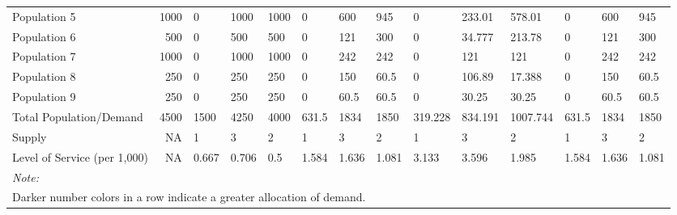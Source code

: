 \documentclass[10pt,letterpaper]{article}
\begin{document}
\begin{landscape}
\begin{table}[t]
\begin{tabular}{lrllllllllllll}
Population 5 & 1000 & \textcolor[HTML]{FCCE25}{0} & \textcolor[HTML]{0D0887}{1000} & \textcolor[HTML]{0D0887}{1000} & \textcolor[HTML]{FCCE25}{0} & \textcolor[HTML]{A51F99}{600} & \textcolor[HTML]{2B0594}{945} & \textcolor[HTML]{FCCE25}{0} & \textcolor[HTML]{F0804E}{233.01} & \textcolor[HTML]{AB2494}{578.01} & \textcolor[HTML]{FCCE25}{0} & \textcolor[HTML]{A51F99}{600} & \textcolor[HTML]{2B0594}{945}\\
\addlinespace
Population 6 & 500 & \textcolor[HTML]{FCCE25}{0} & \textcolor[HTML]{0D0887}{500} & \textcolor[HTML]{0D0887}{500} & \textcolor[HTML]{FCCE25}{0} & \textcolor[HTML]{EF7D50}{121} & \textcolor[HTML]{A51F99}{300} & \textcolor[HTML]{FCCE25}{0} & \textcolor[HTML]{FDB42F}{34.777} & \textcolor[HTML]{CE4B75}{213.78} & \textcolor[HTML]{FCCE25}{0} & \textcolor[HTML]{EF7D50}{121} & \textcolor[HTML]{A51F99}{300}\\
Population 7 & 1000 & \textcolor[HTML]{FCCE25}{0} & \textcolor[HTML]{0D0887}{1000} & \textcolor[HTML]{0D0887}{1000} & \textcolor[HTML]{FCCE25}{0} & \textcolor[HTML]{EF7D50}{242} & \textcolor[HTML]{EF7D50}{242} & \textcolor[HTML]{FCCE25}{0} & \textcolor[HTML]{FCA238}{121} & \textcolor[HTML]{FCA238}{121} & \textcolor[HTML]{FCCE25}{0} & \textcolor[HTML]{EF7D50}{242} & \textcolor[HTML]{EF7D50}{242}\\
Population 8 & 250 & \textcolor[HTML]{FCCE25}{0} & \textcolor[HTML]{0D0887}{250} & \textcolor[HTML]{0D0887}{250} & \textcolor[HTML]{FCCE25}{0} & \textcolor[HTML]{A51F99}{150} & \textcolor[HTML]{EF7D50}{60.5} & \textcolor[HTML]{FCCE25}{0} & \textcolor[HTML]{CE4B75}{106.89} & \textcolor[HTML]{FDB42F}{17.388} & \textcolor[HTML]{FCCE25}{0} & \textcolor[HTML]{A51F99}{150} & \textcolor[HTML]{EF7D50}{60.5}\\
Population 9 & 250 & \textcolor[HTML]{FCCE25}{0} & \textcolor[HTML]{0D0887}{250} & \textcolor[HTML]{0D0887}{250} & \textcolor[HTML]{FCCE25}{0} & \textcolor[HTML]{EF7D50}{60.5} & \textcolor[HTML]{EF7D50}{60.5} & \textcolor[HTML]{FCCE25}{0} & \textcolor[HTML]{FCA238}{30.25} & \textcolor[HTML]{FCA238}{30.25} & \textcolor[HTML]{FCCE25}{0} & \textcolor[HTML]{EF7D50}{60.5} & \textcolor[HTML]{EF7D50}{60.5}\\
Total Population/Demand & 4500 & 1500 & 4250 & 4000 & 631.5 & 1834 & 1850 & 319.228 & 834.191 & 1007.744 & 631.5 & 1834 & 1850\\
\addlinespace
Supply & NA & 1 & 3 & 2 & 1 & 3 & 2 & 1 & 3 & 2 & 1 & 3 & 2\\
Level of Service (per 1,000) & NA & 0.667 & 0.706 & 0.5 & 1.584 & 1.636 & 1.081 & 3.133 & 3.596 & 1.985 & 1.584 & 1.636 & 1.081\\
\bottomrule
\multicolumn{14}{l}{\textit{Note: }}\\
\multicolumn{14}{l}{Darker number colors in a row indicate a greater allocation of demand. }\\
\end{tabular}
\end{table}
\end{landscape}
\end{document}
